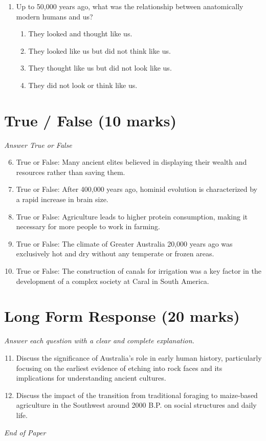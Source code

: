\documentclass[12pt]{article}
\begin{document}
\begin{enumerate}[label=\arabic*.]
\begin{enumerate}[label=(\alph*)]
    \item abstained from sexual relations
\end{enumerate}
\item Up to 50,000 years ago, what was the relationship between anatomically modern humans and us?
\begin{enumerate}[label=(\alph*)]
    \item They looked and thought like us.
    \item They looked like us but did not think like us.
    \item They thought like us but did not look like us.
    \item They did not look or think like us.
\end{enumerate}
\end{enumerate}

\section*{True / False (10 marks)}
\textit{Answer True or False}
\begin{enumerate}[label=\arabic*.]
\setcounter{enumi}{5}
\item True or False: Many ancient elites believed in displaying their wealth and resources rather than saving them.
\item True or False: After 400,000 years ago, hominid evolution is characterized by a rapid increase in brain size.
\item True or False: Agriculture leads to higher protein consumption, making it necessary for more people to work in farming.
\item True or False: The climate of Greater Australia 20,000 years ago was exclusively hot and dry without any temperate or frozen areas.
\item True or False: The construction of canals for irrigation was a key factor in the development of a complex society at Caral in South America.
\end{enumerate}

\section*{Long Form Response (20 marks)}
\textit{Answer each question with a clear and complete explanation.}
\begin{enumerate}[label=\arabic*.]
\setcounter{enumi}{10}
\item Discuss the significance of Australia's role in early human history, particularly focusing on the earliest evidence of etching into rock faces and its implications for understanding ancient cultures.
\item Discuss the impact of the transition from traditional foraging to maize-based agriculture in the Southwest around 2000 B.P. on social structures and daily life.
\end{enumerate}

\vfill
\noindent\textit{End of Paper}
\end{document}
